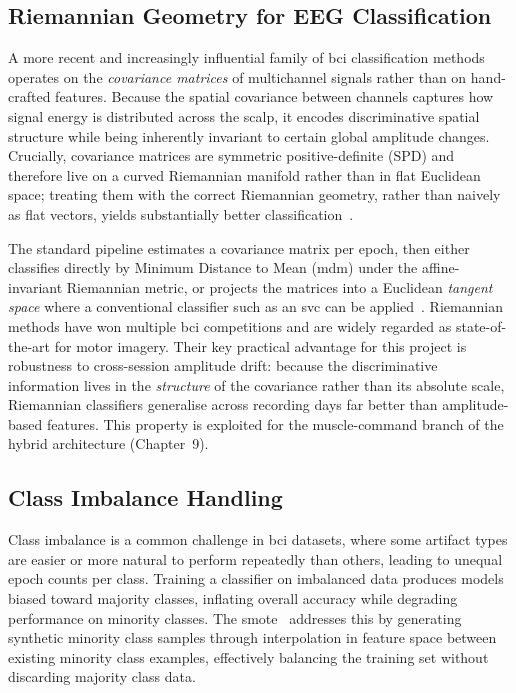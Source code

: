 \subsection{Riemannian Geometry for EEG Classification}
\label{subsec:riemann_litt}

A more recent and increasingly influential family of \acrshort{bci}
classification methods operates on the \emph{covariance matrices} of
multichannel signals rather than on hand-crafted features. Because the
spatial covariance between channels captures how signal energy is
distributed across the scalp, it encodes discriminative spatial
structure while being inherently invariant to certain global amplitude
changes. Crucially, covariance matrices are symmetric positive-definite
(SPD) and therefore live on a curved Riemannian manifold rather than in
flat Euclidean space; treating them with the correct Riemannian
geometry, rather than naively as flat vectors, yields substantially
better classification~\cite{barachant2012riemann}.

The standard pipeline estimates a covariance matrix per epoch, then
either classifies directly by Minimum Distance to Mean
(\acrshort{mdm}) under the affine-invariant Riemannian metric, or
projects the matrices into a Euclidean \emph{tangent space} where a
conventional classifier such as an \acrshort{svc} can be
applied~\cite{barachant2012riemann}. Riemannian methods have won
multiple \acrshort{bci} competitions and are widely regarded as
state-of-the-art for motor imagery. Their key practical advantage for
this project is robustness to cross-session amplitude drift: because
the discriminative information lives in the \emph{structure} of the
covariance rather than its absolute scale, Riemannian classifiers
generalise across recording days far better than amplitude-based
features. This property is exploited for the muscle-command branch of
the hybrid architecture (Chapter~9).

\subsection{Class Imbalance Handling}

Class imbalance is a common challenge in \acrshort{bci} datasets,
where some artifact types are easier or more natural to perform
repeatedly than others, leading to unequal epoch counts per class.
Training a classifier on imbalanced data produces models biased
toward majority classes, inflating overall accuracy while degrading
performance on minority classes. The \acrfull{smote}~\cite{chawla2002smote}
addresses this by generating synthetic minority class samples through
interpolation in feature space between existing minority class
examples, effectively balancing the training set without discarding
majority class data.

